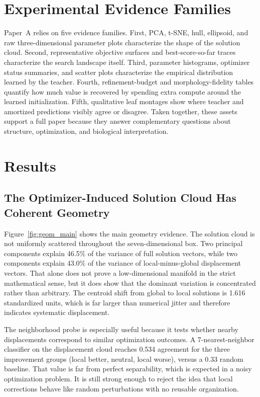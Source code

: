 \documentclass[11pt,a4paper]{article}
\begin{document}
\section{Experimental Evidence Families}
Paper~A relies on five evidence families.
First, PCA, t-SNE, hull, ellipsoid, and raw three-dimensional parameter plots characterize the shape of the solution cloud.
Second, representative objective surfaces and best-score-so-far traces characterize the search landscape itself.
Third, parameter histograms, optimizer status summaries, and scatter plots characterize the empirical distribution learned by the teacher.
Fourth, refinement-budget and morphology-fidelity tables quantify how much value is recovered by spending extra compute around the learned initialization.
Fifth, qualitative leaf montages show where teacher and amortized predictions visibly agree or disagree.
Taken together, these assets support a full paper because they answer complementary questions about structure, optimization, and biological interpretation.

\section{Results}
\subsection{The Optimizer-Induced Solution Cloud Has Coherent Geometry}
Figure~\ref{fig:geom_main} shows the main geometry evidence.
The solution cloud is not uniformly scattered throughout the seven-dimensional box.
Two principal components explain 46.5\% of the variance of full solution vectors, while two components explain 43.0\% of the variance of local-minus-global displacement vectors.
That alone does not prove a low-dimensional manifold in the strict mathematical sense, but it does show that the dominant variation is concentrated rather than arbitrary.
The centroid shift from global to local solutions is 1.616 standardized units, which is far larger than numerical jitter and therefore indicates systematic displacement.

The neighborhood probe is especially useful because it tests whether nearby displacements correspond to similar optimization outcomes.
A 7-nearest-neighbor classifier on the displacement cloud reaches 0.534 agreement for the three improvement groups (local better, neutral, local worse), versus a 0.33 random baseline.
That value is far from perfect separability, which is expected in a noisy optimization problem.
It is still strong enough to reject the idea that local corrections behave like random perturbations with no reusable organization.
\end{document}
